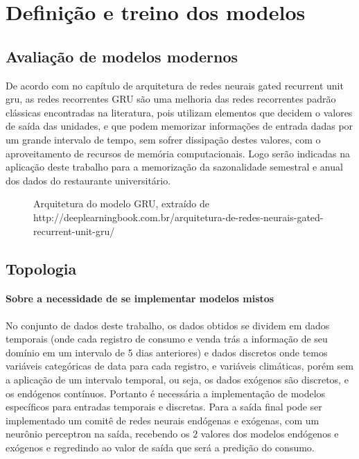 \documentclass[	12pt, Times, openright, twoside, a4paper, english, brazil]{abntex2}
\begin{document}
    \section{Definição e treino dos modelos}
        \subsection{Avaliação de modelos modernos}
         	De acordo com \cite{DLB} no capítulo de arquitetura de redes neurais gated recurrent unit gru, as redes recorrentes GRU são uma melhoria das redes recorrentes padrão clássicas encontradas na literatura, pois utilizam elementos que decidem o valores de saída das unidades, e que podem memorizar informações de entrada dadas por um grande intervalo de tempo, sem sofrer dissipação destes valores, com o aproveitamento de recursos de memória computacionais. Logo serão indicadas na aplicação deste trabalho para a memorização da sazonalidade semestral e anual dos dados do restaurante universitário.
            \begin{figure}[!ht]
            	\caption{Arquitetura do modelo GRU, extraído de http://deeplearningbook.com.br/arquitetura-de-redes-neurais-gated-recurrent-unit-gru/ \label{fig:gru-arch}}
            \end{figure}
        \subsection{Topologia}
            \paragraph{Sobre a necessidade de se implementar modelos mistos}
                No conjunto de dados deste trabalho, os dados obtidos se dividem em dados temporais (onde cada registro de consumo e venda trás a informação de seu domínio em um intervalo de 5 dias anteriores) e dados discretos onde temos variáveis categóricas de data para cada registro, e variáveis climáticas, porém sem a aplicação de um intervalo temporal, ou seja, os dados exógenos são discretos, e os endógenos contínuos.
                Portanto é necessária a implementação de modelos específicos para entradas temporais e discretas.
                Para a saída final pode ser implementado um comitê de redes neurais endógenas e exógenas, com um neurônio perceptron na saída, recebendo os 2 valores dos modelos endógenos e exógenos e regredindo ao valor de saída que será a predição do consumo.
\end{document}
